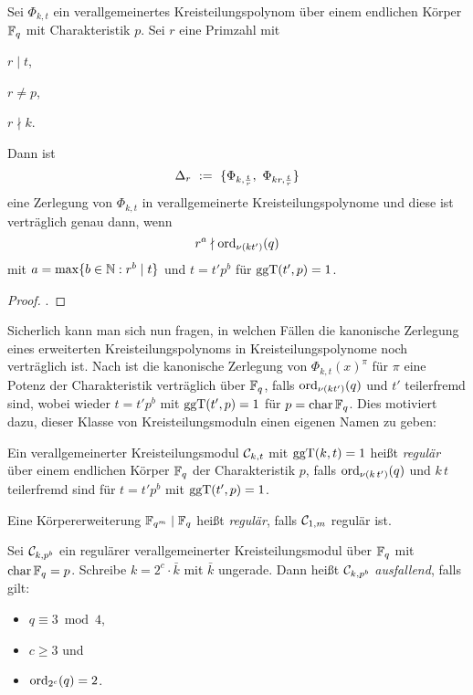 \begin{satz}
  \label{satz:zerlegungssatz}
  Sei $\Phi_{k,t}$ ein verallgemeinertes Kreisteilungspolynom über einem
  endlichen Körper $\mathbb{F}_q$ mit Charakteristik $p$. Sei $r$ eine Primzahl
  mit

  \begin{itemize*}[itemjoin={\qquad}]
    \item $r \mid t$,
    \item $r \neq p$,
    \item $r \nmid k$.
  \end{itemize*}

  Dann ist 
  \[ \Delta_r \ :=\  \{ \Phi_{k,\frac{t}{r}},\ \Phi_{kr, \frac{t}{r}}\}\]
  eine Zerlegung von $\Phi_{k,t}$ in verallgemeinerte Kreisteilungspolynome und
  diese ist verträglich genau dann, wenn
  \[ r^a \nmid \operatorname{ord}_{\nu(kt')}(q) \]
  mit $a = \max\{ b\in \mathbb{N}: r^b \mid t\}$ und 
  $t=t'p^b$ für $\operatorname{ggT}(t',p)=1$.
\end{satz}
\begin{proof}
  \autocite[Decomposition Theorem, Section 19]{hachenberger1997finite}.
\end{proof}


Sicherlich kann man sich nun fragen, in welchen Fällen die kanonische Zerlegung
eines erweiterten Kreisteilungspolynoms in Kreisteilungspolynome noch
verträglich ist. Nach \autocite[Theorem 19.10]{hachenberger1997finite} 
ist die kanonische Zerlegung von $\Phi_{k,t}(x)^\pi$ für $\pi$ eine Potenz der
Charakteristik verträglich über 
$\mathbb{F}_q$, falls $\operatorname{ord}_{\nu(kt')}(q)$ und $t'$ teilerfremd sind,
wobei wieder $t = t'p^b$ mit $\operatorname{ggT}(t',p)=1$ für $p=\operatorname{char}\mathbb{F}_q$. Dies motiviert
dazu, dieser Klasse von Kreisteilungsmoduln einen eigenen Namen zu geben:

\begin{definition}[regulär]
  \label{def:regulaer}
  Ein verallgemeinerter Kreisteilungsmodul $\mathcal{C}_{k,t}$ 
  mit $\operatorname{ggT}(k,t)=1$ heißt \emph{regulär} über 
  einem endlichen Körper $\mathbb{F}_q$ der Charakteristik $p$,
  falls $\operatorname{ord}_{\nu(k\,t')}(q)$ und $k\,t$ teilerfremd sind für
  $t=t'p^b$ mit $\operatorname{ggT}(t',p)=1$.

  Eine Körpererweiterung $\mathbb{F}_{q^m} \mid \mathbb{F}_q$ heißt \emph{regulär}, falls
  $\mathcal{C}_{1,m}$ regulär ist.
\end{definition}


\begin{definition}[ausfallend]
  \label{def:ausfallend}
  Sei $\mathcal{C}_{k, p^b}$ ein regulärer verallgemeinerter Kreisteilungsmodul 
  über $\mathbb{F}_q$ mit $\operatorname{char} \mathbb{F}_q = p$. Schreibe $k = 2^c \cdot \bar k$ mit $\bar
  k$ ungerade. Dann heißt $\mathcal{C}_{k,p^b}$ \emph{ausfallend}, falls gilt:
  \begin{itemize}
    \item $q \equiv 3 \bmod 4$,
    \item $c \geq 3$ und 
    \item $\operatorname{ord}_{2^c}(q) = 2$.
  \end{itemize}
\end{definition}



